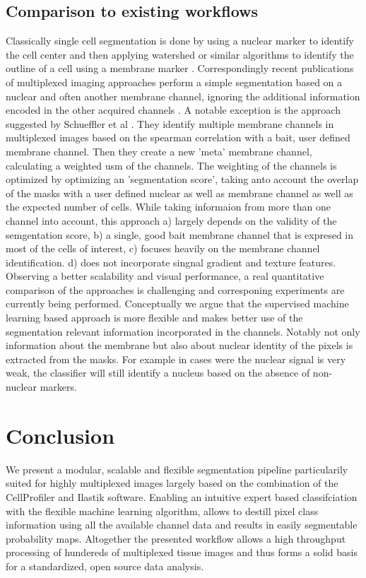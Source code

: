 \documentclass[a4paper]{article}
\begin{document}
\subsection{Comparison to existing workflows}
Classically single cell segmentation is done by using a nuclear marker to identify the cell center
and then applying watershed or similar algorithms to identify the outline of a cell using a
membrane marker \cite{carpenter_cellprofiler:_2006}. Correspondingly recent publications of multiplexed imaging
approaches perform a simple segmentation based on a nuclear and often another membrane channel, ignoring the
additional information encoded in the other acquired channels \cite{lin_highly_2015,
angelo_multiplexed_2014}.
A notable exception is the approach suggested by Schueffler et al \cite{schuffler_automatic_2015}. They identify
multiple membrane channels in multiplexed images based on the spearman correlation with a bait, user
defined membrane channel. Then they create a new 'meta' membrane channel, calculating a weighted
usm of the channels. The weighting of the channels is optimized by optimizing an 'segmentation
score', taking anto account the overlap of the masks with a user defined nuclear as well as membrane channel as well as the expected number of
cells. While taking informaion from more than one channel into account, this approach a) largely
depends on the validity of the semgentation score, b) a single, good bait membrane channel that is expresed
in most of the cells of interest, c) focuses heavily on the membrane channel identification. d)
does not incorporate singnal gradient and texture features.
Observing a better scalability and visual performance,  a real quantitative comparison of the approaches
is challenging and corresponing experiments are currently being performed. Conceptually we argue that the supervised machine
learning based approach is more flexible and makes better use of the segmentation relevant
information incorporated in the channels. Notably not only information about the membrane but also
about nuclear identity of the pixels is extracted from the masks. For example in cases were the
nuclear signal is very weak, the classifier will still identify a nucleus based on the absence of
non-nuclear markers.


\section{Conclusion}

We present a modular, scalable and flexible segmentation pipeline particularily suited for highly
multiplexed images largely based on the combination of the CellProfiler and Ilastik software.
Enabling an intuitive expert based classifciation with the flexible machine learning algorithm,
allows to destill pixel class information using all the available channel data and results in
easily segmentable probability maps. Altogether the presented workflow allows a high throughput
processing of hundereds of multiplexed tissue images and thus forms a solid basis for a
standardized, open source data analysis.



\end{document}
